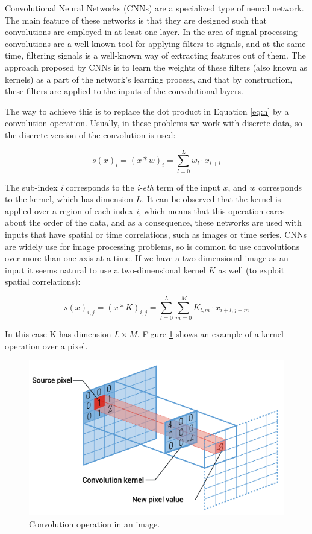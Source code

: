 Convolutional Neural Networks (CNNs) are a specialized type of neural network. The main feature of these networks is that they are designed such that convolutions are employed in at least one layer. In the area of signal processing convolutions are a well-known tool for applying filters to signals, and at the same time, filtering signals is a well-known way of extracting features out of them. The approach proposed by CNNs is to learn the weights of these filters (also known as kernels) as a part of the network's learning process, and that by construction, these filters are applied to the inputs of the convolutional layers.

The way to achieve this is to replace the dot product in Equation \ref{eq:h} by a convolution operation. Usually, in these problems we work with discrete data, so the discrete version of the convolution is used:

\begin{equation}
    s(x)_{i} = (x * w)_{i} = \sum_{l=0}^{L}w_{l} \cdot x_{i+l}
\end{equation}
    
The sub-index \emph{i} corresponds to the \emph{i-eth} term of the input $x$, and $w$ corresponds to the kernel, which has dimension $L$. It can be observed that the kernel is applied over a region of each index \emph{i}, which means that this operation cares about the order of the data, and as a consequence, these networks are used with inputs that have spatial or time correlations, such as images or time series. CNNs are widely use for image processing problems, so is common to use convolutions over more than one axis at a time. If we have a two-dimensional image as an input it seems natural to use a two-dimensional kernel $K$ as well (to exploit spatial correlations):

\begin{equation}
    s(x)_{i,j} = (x * K)_{i,j} = \sum_{l=0}^{L}\sum_{m=0}^{M}K_{l, m} \cdot x_{i+l, j+m}
\end{equation}

In this case K has dimension $L \times M$. Figure \ref{fig:conv} shows an example of a kernel operation over a pixel.

\begin{figure}[H]
    \centering
    \includegraphics[width=0.6\linewidth]{imagenes/cap1/convolution.pdf}
    \caption{Convolution operation in an image.}
    \label{fig:conv}
\end{figure}

